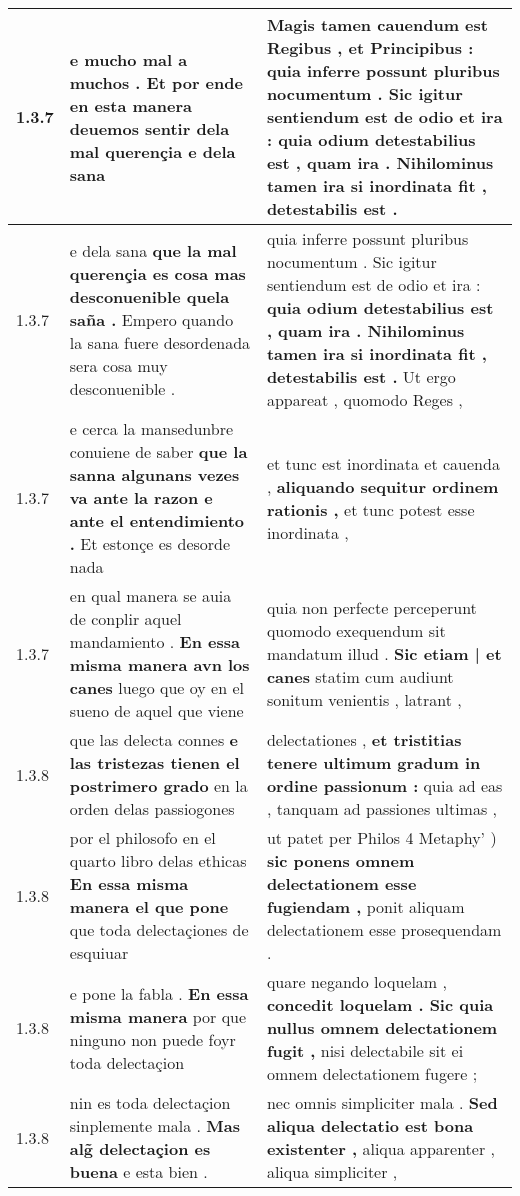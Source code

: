 \begin{tabular}{|p{1cm}|p{6.5cm}|p{6.5cm}|}
1.3.7 & e mucho mal a muchos . \textbf{ Et por ende en esta manera deuemos sentir dela mal querençia } e dela sana & Magis tamen cauendum est Regibus , et Principibus : \textbf{ quia inferre possunt pluribus nocumentum . Sic igitur sentiendum est de odio et ira : } quia odium detestabilius est , quam ira . Nihilominus tamen ira si inordinata fit , detestabilis est . \\\hline
1.3.7 & e dela sana \textbf{ que la mal querençia es cosa mas desconuenible quela saña . } Empero quando la sana fuere desordenada sera cosa muy desconuenible . & quia inferre possunt pluribus nocumentum . Sic igitur sentiendum est de odio et ira : \textbf{ quia odium detestabilius est , quam ira . Nihilominus tamen ira si inordinata fit , detestabilis est . } Ut ergo appareat , quomodo Reges , \\\hline
1.3.7 & e cerca la mansedunbre conuiene de saber \textbf{ que la sanna algunans vezes va ante la razon e ante el entendimiento . } Et estonçe es desorde nada & et tunc est inordinata et cauenda , \textbf{ aliquando sequitur ordinem rationis , } et tunc potest esse inordinata , \\\hline
1.3.7 & en qual manera se auia de conplir aquel mandamiento . \textbf{ En essa misma manera avn los canes } luego que oy en el sueno de aquel que viene & quia non perfecte perceperunt quomodo exequendum sit mandatum illud . \textbf{ Sic etiam | et canes } statim cum audiunt sonitum venientis , latrant , \\\hline
1.3.8 & que las delecta connes \textbf{ e las tristezas tienen el postrimero grado } en la orden delas passiogones & delectationes , \textbf{ et tristitias tenere ultimum gradum in ordine passionum : } quia ad eas , tanquam ad passiones ultimas , \\\hline
1.3.8 & por el philosofo en el quarto libro delas ethicas \textbf{ En essa misma manera el que pone } que toda delectaçiones de esquiuar & ut patet per Philos 4 Metaphy’ ) \textbf{ sic ponens omnem delectationem esse fugiendam , } ponit aliquam delectationem esse prosequendam . \\\hline
1.3.8 & e pone la fabla . \textbf{ En essa misma manera } por que ninguno non puede foyr toda delectaçion & quare negando loquelam , \textbf{ concedit loquelam . Sic quia nullus omnem delectationem fugit , } nisi delectabile sit ei omnem delectationem fugere ; \\\hline
1.3.8 & nin es toda delectaçion sinplemente mala . \textbf{ Mas alg̃ delectaçion es buena } e esta bien . & nec omnis simpliciter mala . \textbf{ Sed aliqua delectatio est bona existenter , } aliqua apparenter , aliqua simpliciter , \\\hline

\end{tabular}
